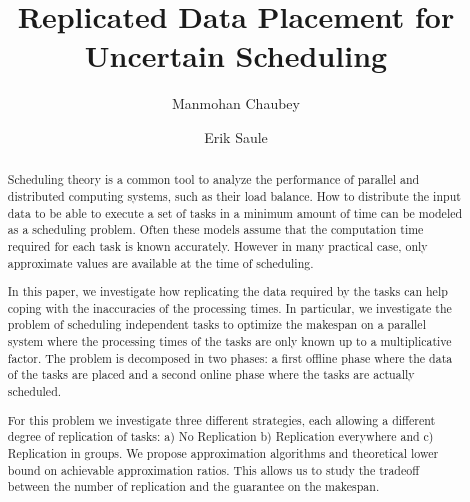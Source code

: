 \documentclass[twocolumn]{svjour3}
\begin{document}
\title{Replicated Data Placement for Uncertain Scheduling}

\author{Manmohan Chaubey \and Erik Saule}



\maketitle


\begin{abstract}
  Scheduling theory is a common tool to analyze the
  performance of parallel and distributed computing systems, such as their load
  balance. How to distribute the input data to be able to execute a
  set of tasks in a minimum amount of time can be modeled as a
  scheduling problem. Often these models assume that the computation
  time required for each task is known accurately. However in many
  practical case, only approximate values are available at the time of
  scheduling.

  In this paper, we investigate how replicating the data required by
  the tasks can help coping with the inaccuracies of the processing
  times. In particular, we investigate the problem of scheduling
  independent tasks to optimize the makespan on a parallel system
  where the processing times of the tasks are only known up to a
  multiplicative factor. The problem is decomposed in two phases: a
  first offline phase where the data of the tasks are placed and a second
  online phase where the tasks are actually scheduled.

  For this problem we investigate three different strategies, each
  allowing a different degree of replication of tasks: a) No
  Replication b) Replication everywhere and c) Replication in
  groups. We propose approximation algorithms and theoretical lower
  bound on achievable approximation ratios.  This allows us to study
  the tradeoff between the number of replication and the guarantee on
  the makespan.


\end{abstract}
\end{document}
